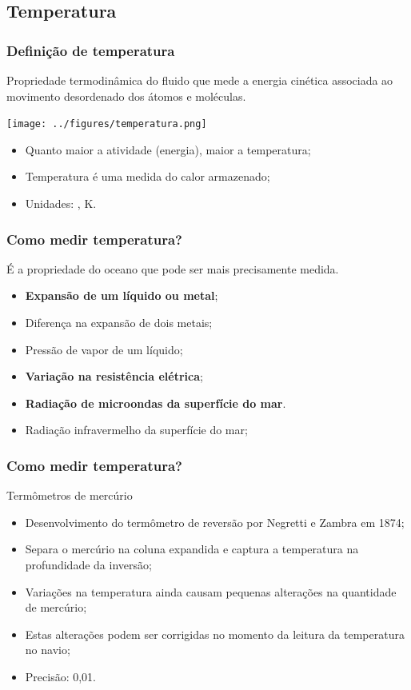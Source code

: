 \subsection{Temperatura}
\begin{frame}
\frametitle{Definição de temperatura}
    \small{
    \begin{block}{}
    Propriedade termodinâmica do fluido que mede a energia cinética associada
    ao movimento desordenado dos átomos e moléculas.
    \end{block}
    }
    \pause
    \begin{center}
        \texttt{[image: ../figures/temperatura.png]}
    \end{center}
    \pause
    \footnotesize{
    \begin{itemize}[<+-| alert@+>]
    \item Quanto maior a atividade (energia), maior a temperatura;
    \item Temperatura é uma medida do calor armazenado;
    \item Unidades: \textcelsius, K.
    \end{itemize}
    }
\end{frame}

\begin{frame}
\frametitle{Como medir temperatura?}
    É a propriedade do oceano que pode ser mais precisamente medida.
    \small{
    \begin{itemize}[<+-| alert@+>]
    \item {\bf Expansão de um líquido ou metal};
    \item Diferença na expansão de dois metais;
    \item Pressão de vapor de um líquido;
    \item {\bf Variação na resistência elétrica};
    \item {\bf Radiação de microondas da superfície do mar}.
    \item Radiação infravermelho da superfície do mar;
    \end{itemize}
    }
\end{frame}

\begin{frame}
\frametitle{Como medir temperatura?}
    Termômetros de mercúrio
    \small{
    \begin{itemize}[<+-| alert@+>]
    \item Desenvolvimento do termômetro de reversão por Negretti e Zambra em
          1874;
    \item Separa o mercúrio na coluna expandida e captura a temperatura na
          profundidade da inversão;
    \item Variações na temperatura ainda causam pequenas alterações na
          quantidade de mercúrio;
    \item Estas alterações podem ser corrigidas no momento da leitura da
          temperatura no navio;
    \item Precisão: 0,01\textcelsius.
    \end{itemize}
    }
\end{frame}

